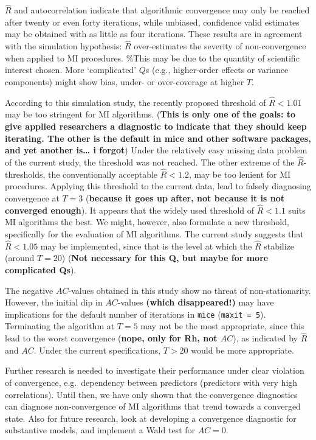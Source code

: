 \documentclass[Royal,times,sageh]{sagej}
\begin{document}
\(\widehat{R}\) and autocorrelation indicate that algorithmic
convergence may only be reached after twenty or even forty iterations,
while unbiased, confidence valid estimates may be obtained with as
little as four iterations. These results are in agreement with the
simulation hypothesis: \(\widehat{R}\) over-estimates the severity of
non-convergence when applied to MI procedures. \%This may be due to the
quantity of scientific interest chosen. More `complicated' \(Q\)s (e.g.,
higher-order effects or variance components) might show bias, under- or
over-coverage at higher \(T\).

According to this simulation study, the recently proposed threshold of
\(\widehat{R}<1.01\) may be too stringent for MI algorithms.
(\textbf{This is only one of the goals: to give applied researchers a
diagnostic to indicate that they should keep iterating. The other is the
default in mice and other software packages, and yet another is\ldots{}
i forgot}) Under the relatively easy missing data problem of the current
study, the threshold was not reached. The other extreme of the
\(\widehat{R}\)-thresholds, the conventionally acceptable
\(\widehat{R} <1.2\), may be too lenient for MI procedures. Applying
this threshold to the current data, lead to falsely diagnosing
convergence at \(T = 3\) (\textbf{because it goes up after, not because
it is not converged enough}). It appears that the widely used threshold
of \(\widehat{R} < 1.1\) suits MI algorithms the best. We might,
however, also formulate a new threshold, specifically for the evaluation
of MI algorithms. The current study suggests that \(\widehat{R} < 1.05\)
may be implemented, since that is the level at which the \(\widehat{R}\)
stabilize (around \(T = 20\)) (\textbf{Not necessary for this Q, but
maybe for more complicated Qs}).

The negative \(AC\)-values obtained in this study show no threat of
non-stationarity. However, the initial dip in \(AC\)-values
\textbf{(which disappeared!)} may have implications for the default
number of iterations in \texttt{mice} (\texttt{maxit\ =\ 5}).
Terminating the algorithm at \(T=5\) may not be the most appropriate,
since this lead to the worst convergence (\textbf{nope, only for Rh, not
\(AC\)}), as indicated by \(\widehat{R}\) and \(AC\). Under the current
specifications, \(T>20\) would be more appropriate.

Further research is needed to investigate their performance under clear
violation of convergence, e.g.~dependency between predictors (predictors
with very high correlations). Until then, we have only shown that the
convergence diagnostics can diagnose non-convergence of MI algorithms
that trend towards a converged state. Also for future research, look at
developing a convergence diagnostic for substantive models, and
implement a Wald test for \(AC = 0\).
\end{document}
